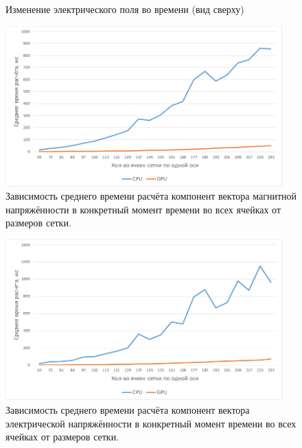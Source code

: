 \begin{figure}
\begin{subfigure}[b]{0.3\textwidth}
        \label{fig:mouse}
    \end{subfigure}

    \caption{Изменение электрического поля во времени (вид сверху)}\label{fig:animals}
\end{figure}
\clearpage
\begin{figure}[p]
\centering
\includegraphics[width=0.95\textwidth]{include/graphics/image12}
\caption{Зависимость среднего времени расчёта компонент вектора магнитной напряжённости в конкретный момент времени во всех ячейках от размеров сетки.}
\label{fig:1stComparsion}
\end{figure}
\begin{figure}[p]
\centering
\includegraphics[width=0.95\textwidth]{include/graphics/image13}
\caption{Зависимость среднего времени расчёта компонент вектора электрической напряжённости в конкретный момент времени во всех ячейках от размеров сетки.}
\label{fig:2ndComparsion}
\end{figure}

\clearpage